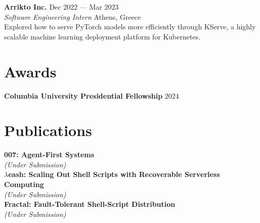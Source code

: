 \documentclass[margin, 12pt]{resume}
\newcommand{\cvName}{Nikos Pagonas}
\newcommand{\sectionVSpace}{\vspace{-3.5ex}} %
\newcommand{\authors}[1]{#1\xspace}
\newcommand{\equalContributionNote}{(*equal contribution)\xspace}
\newcommand{\fellowship}[1]{\textbf{#1}\xspace}
\newcommand{\institution}[1]{\textbf{#1}\xspace}
\newcommand{\interval}[2]{#1 --- #2\xspace}
\newcommand{\rSection}[1]{\sectionVSpace\section{#1}\xspace}
\newcommand{\paperTitle}[1]{\textbf{#1}\xspace}
\newcommand{\place}[1]{#1\xspace}
\newcommand{\role}[1]{\textit{#1}\xspace}
\newcommand{\stitle}[1]{#1:\xspace}
\newcommand{\underSubmission}{\textit{(Under Submission)}\xspace}
\newcommand{\venue}[1]{\textit{#1}\xspace}
\begin{document}
\begin{resume}

    \institution{Arrikto Inc.} \hfill \interval{Dec 2022}{Mar 2023} \\
    \role{Software Engineering Intern} \hfill \place{Athens, Greece} \\
    Explored how to serve PyTorch models more efficiently through KServe, a highly scalable machine learning deployment platform for Kubernetes. \\

    \rSection{Awards}

    \fellowship{Columbia University Presidential Fellowship} \hfill 2024 \\

    \rSection{Publications}

    \newcommand{\me}{\textbf{\cvName}\xspace}

    \paperTitle{007: Agent-First Systems} \\
    \underSubmission \\

    \paperTitle{\( \lambda \)eash: Scaling Out Shell Scripts with Recoverable Serverless Computing} \\
    \underSubmission \\

    \paperTitle{Fractal: Fault-Tolerant Shell-Script Distribution} \\
    \underSubmission \\


\end{resume}
\end{document}
